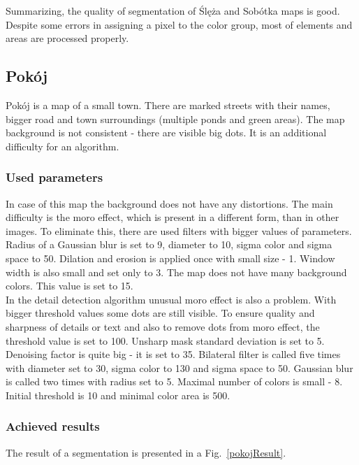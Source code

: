 \documentclass[a4paper,onecolumn,oneside,12pt]{memoir}
\begin{document}
Summarizing, the quality of segmentation of Ślęża and Sobótka maps is good. Despite some errors in
assigning a pixel to the color group, most of elements and areas are processed properly.

\subsection{Pokój}

Pokój is a map of a small town. There are marked streets with their names, bigger road and town
surroundings (multiple ponds and green areas). The map background is not consistent - there are 
visible big dots. It is an additional difficulty for an algorithm.

\subsubsection{Used parameters}

In case of this map the background does not have any distortions. The main difficulty is the moro
effect, which is present in a different form, than in other images. To eliminate this, there are
used filters with bigger values of parameters. Radius of a Gaussian blur is set to 9, diameter to
10, sigma color and sigma space to 50. Dilation and erosion is applied once with small size - 1.
Window width is also small and set only to 3. The map does not have many background colors. This
value is set to 15. \\

In the detail detection algorithm unusual moro effect is also a problem. With bigger threshold
values some dots are still visible. To ensure quality and sharpness of details or text and also to
remove dots from moro effect, the threshold value is set to 100. Unsharp mask standard deviation is
set to 5. Denoising factor is quite big - it is set to 35. Bilateral filter is called five times
with diameter set to 30, sigma color to 130 and sigma space to 50. Gaussian blur is called two times
with radius set to 5. Maximal number of colors is small - 8. Initial threshold is 10 and minimal
color area is 500.

\subsubsection{Achieved results}

The result of a segmentation is presented in a Fig.~\ref{pokojResult}.
\end{document}
